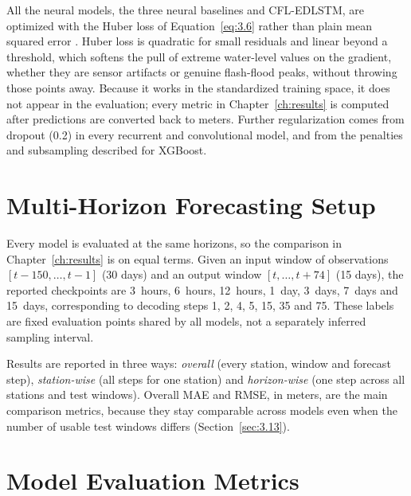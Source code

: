 All the neural models, the three neural baselines and CFL-EDLSTM, are optimized
with the Huber loss of Equation~\eqref{eq:3.6} rather than plain mean squared
error \cite{Huber1964}. Huber loss is quadratic for small residuals and linear
beyond a threshold, which softens the pull of extreme water-level values on the
gradient, whether they are sensor artifacts or genuine flash-flood peaks,
without throwing those points away. Because it works in the standardized
training space, it does not appear in the evaluation; every metric in
Chapter~\ref{ch:results} is computed after predictions are converted back to
meters. Further regularization comes from dropout (0.2) in every recurrent and
convolutional model, and from the penalties and subsampling described for
XGBoost.

\section{Multi-Horizon Forecasting Setup}
\label{sec:3.15}

Every model is evaluated at the same horizons, so the comparison in
Chapter~\ref{ch:results} is on equal terms. Given an input window of
observations $[t-150, \ldots, t-1]$ (30 days) and an output window
$[t, \ldots, t+74]$ (15 days), the reported checkpoints are 3~hours, 6~hours,
12~hours, 1~day, 3~days, 7~days and 15~days, corresponding to decoding steps 1,
2, 4, 5, 15, 35 and 75. These labels are fixed evaluation points shared by all
models, not a separately inferred sampling interval.

Results are reported in three ways: \textit{overall} (every station, window and
forecast step), \textit{station-wise} (all steps for one station) and
\textit{horizon-wise} (one step across all stations and test windows). Overall
MAE and RMSE, in meters, are the main comparison metrics, because they stay
comparable across models even when the number of usable test windows differs
(Section~\ref{sec:3.13}).

\section{Model Evaluation Metrics}
\label{sec:3.16}

